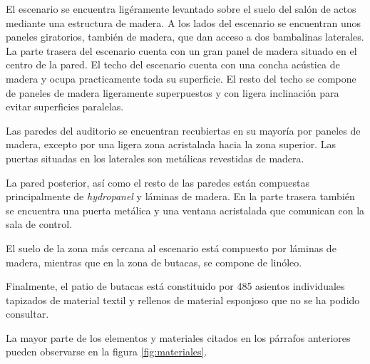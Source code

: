\documentclass[11pt,a4paper]{book}
\begin{document}
 			El escenario se encuentra ligéramente levantado sobre el suelo del salón de actos mediante una estructura de madera. A los lados del escenario se encuentran unos paneles giratorios, también de madera, que dan acceso a dos bambalinas laterales. La parte trasera del escenario cuenta con un gran panel de madera situado en el centro de la pared. El techo del escenario cuenta con una concha acústica de madera y ocupa practicamente toda su superficie. El resto del techo se compone de paneles de madera ligeramente superpuestos y con ligera inclinación para evitar superficies paralelas.
 
 			Las paredes del auditorio se encuentran recubiertas en su mayoría por paneles de madera, excepto por una ligera zona acristalada hacia la zona superior. Las puertas situadas en los laterales son metálicas revestidas de madera. 
 
 			La pared posterior, así como el resto de las paredes están compuestas principalmente de \textit{hydropanel} y láminas de madera. En la parte trasera también se encuentra una puerta metálica y una ventana acristalada que comunican con la sala de control.
 
 			El suelo de la zona más cercana al escenario está compuesto por láminas de madera, mientras que en la zona de butacas, se compone de linóleo.
 			
 			Finalmente, el patio de butacas está constituido por 485 asientos individuales tapizados de material textil y rellenos de material esponjoso que no se ha podido consultar.
 
 			La mayor parte de los elementos y materiales citados en los párrafos anteriores pueden observarse en la figura \ref{fig:materiales}.
 
\end{document}
